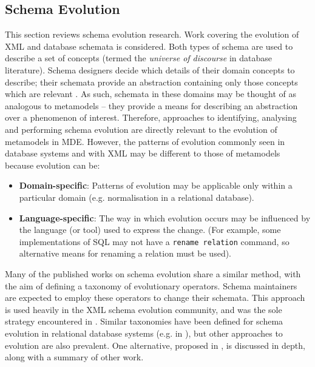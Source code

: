 \subsection{Schema Evolution}
\label{subsec:schema_evolution}
This section reviews schema evolution research. Work covering the evolution of XML and database schemata is considered. Both types of schema are used to describe a set of concepts (termed the \textit{universe of discourse} in database literature). Schema designers decide which details of their domain concepts to describe; their schemata provide an abstraction containing only those concepts which are relevant \cite[pg. 30]{elmasri06database}. As such, schemata in these domains may be thought of as analogous to metamodels -- they provide a means for describing an abstraction over a phenomenon of interest. Therefore, approaches to identifying, analysing and performing schema evolution are directly relevant to the evolution of metamodels in MDE. However, the patterns of evolution commonly seen in database systems and with XML may be different to those of metamodels because evolution can be:

\begin{itemize}
 \item \textbf{Domain-specific}: Patterns of evolution may be applicable only within a particular domain (e.g. normalisation in a relational database).
 \item \textbf{Language-specific}: The way in which evolution occurs may be influenced by the language (or tool) used to express the change. (For example, some implementations of SQL may not have a \texttt{rename relation} command, so alternative means for renaming a relation must be used).
\end{itemize}

Many of the published works on schema evolution share a similar method, with the aim of defining a taxonomy of evolutionary operators. Schema maintainers are expected to employ these operators to change their schemata. This approach is used heavily in the XML schema evolution community, and was the sole strategy encountered in \cite{guerrini05impact,kramer01xem,su01xem}. Similar taxonomies have been defined for schema evolution in relational database systems (e.g. in \cite{banerjee87semantics,edelweiss05temporal}), but other approaches to evolution are also prevalent. One alternative, proposed in \cite{lerner00model}, is discussed in depth, along with a summary of other work.


